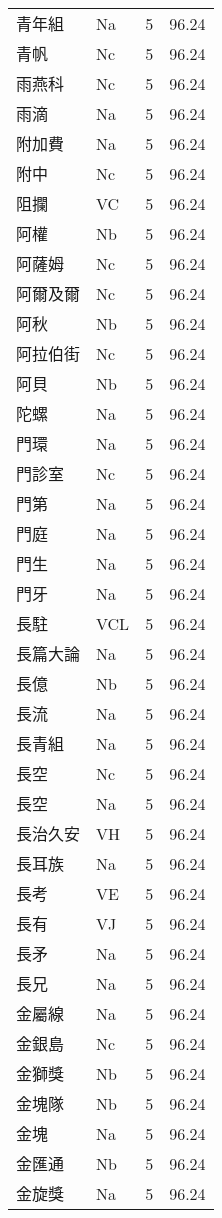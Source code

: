 \documentclass[twocolumn]{book}
\begin{document}
\begin{supertabular}{llrr}
青年組 & Na & 5 &  96.24\\
青帆 & Nc & 5 &  96.24\\
雨燕科 & Nc & 5 &  96.24\\
雨滴 & Na & 5 &  96.24\\
附加費 & Na & 5 &  96.24\\
附中 & Nc & 5 &  96.24\\
阻攔 & VC & 5 &  96.24\\
阿權 & Nb & 5 &  96.24\\
阿薩姆 & Nc & 5 &  96.24\\
阿爾及爾 & Nc & 5 &  96.24\\
阿秋 & Nb & 5 &  96.24\\
阿拉伯街 & Nc & 5 &  96.24\\
阿貝 & Nb & 5 &  96.24\\
陀螺 & Na & 5 &  96.24\\
門環 & Na & 5 &  96.24\\
門診室 & Nc & 5 &  96.24\\
門第 & Na & 5 &  96.24\\
門庭 & Na & 5 &  96.24\\
門生 & Na & 5 &  96.24\\
門牙 & Na & 5 &  96.24\\
長駐 & VCL & 5 &  96.24\\
長篇大論 & Na & 5 &  96.24\\
長億 & Nb & 5 &  96.24\\
長流 & Na & 5 &  96.24\\
長青組 & Na & 5 &  96.24\\
長空 & Nc & 5 &  96.24\\
長空 & Na & 5 &  96.24\\
長治久安 & VH & 5 &  96.24\\
長耳族 & Na & 5 &  96.24\\
長考 & VE & 5 &  96.24\\
長有 & VJ & 5 &  96.24\\
長矛 & Na & 5 &  96.24\\
長兄 & Na & 5 &  96.24\\
金屬線 & Na & 5 &  96.24\\
金銀島 & Nc & 5 &  96.24\\
金獅獎 & Nb & 5 &  96.24\\
金塊隊 & Nb & 5 &  96.24\\
金塊 & Na & 5 &  96.24\\
金匯通 & Nb & 5 &  96.24\\
金旋獎 & Na & 5 &  96.24\\

\end{supertabular}
\end{document}
